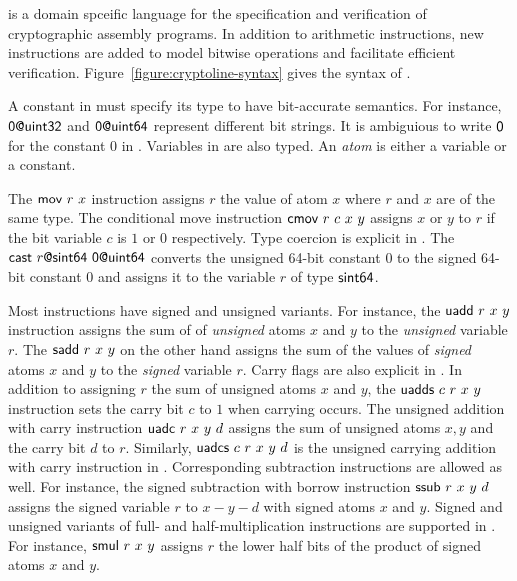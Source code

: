 \cryptoline is a domain spceific language for the specification and
verification of cryptographic assembly programs. In addition to
arithmetic instructions, new instructions are added to model bitwise
operations and facilitate efficient verification.
Figure~\ref{figure:cryptoline-syntax} gives the syntax of \cryptoline.

A constant in \cryptoline must specify its type to have bit-accurate
semantics. For instance, ${\textsf{{0@uint32}}}$ and ${\textsf{{0@uint64}}}$
represent different bit strings. It is ambiguious to write
${\textsf{{0}}}$ for the constant $0$ in \cryptoline. Variables in
\cryptoline are also typed. An \emph{atom} is either a variable or a
constant.

The ${\textsf{{mov}}}\ r\ x$ instruction assigns $r$ the value of atom $x$ where
$r$ and $x$ are of the same type. The conditional move instruction
${\textsf{{cmov}}}\ r\ c\ x\ y$ assigns $x$ or $y$ to $r$ if the bit variable
$c$ is $1$ or $0$ respectively. Type coercion is explicit in
\cryptoline. The $\clVPCast\ r\mytextsf{@sint64}\ \mytextsf{0@uint64}$
converts the unsigned 64-bit constant $0$ to the signed 64-bit
constant $0$ and assigns it to the variable $r$ of type ${\textsf{{sint64}}}$.

Most \cryptoline instructions have signed and unsigned variants. For
instance, the ${\textsf{{uadd}}}\ r\ x\ y$ instruction assigns the sum of
of \emph{unsigned} atoms $x$ and $y$ to the \emph{unsigned} variable
$r$. The ${\textsf{{sadd}}}\ r\ x\ y$ on the other hand assigns the sum of the
values of \emph{signed} atoms $x$ and $y$ to the \emph{signed}
variable $r$. Carry flags are also explicit in \cryptoline. In
addition to assigning $r$ the sum of unsigned atoms $x$ and $y$, the
${\textsf{{uadds}}}\ c\ r\ x\ y$ instruction sets the carry bit $c$ to $1$ when
carrying occurs. The unsigned addition with carry instruction
${\textsf{{uadc}}}\ r\ x\ y\ d$ assigns the sum of unsigned atoms $x, y$ and the
carry bit $d$ to $r$. Similarly, ${\textsf{{uadcs}}}\ c\ r\ x\ y\ d$ is the
unsigned carrying addition with carry instruction in \cryptoline.
Corresponding subtraction instructions are allowed as well. For
instance, the signed subtraction with borrow instruction $\clSSub\ r\
x\ y\ d$ assigns the signed variable $r$ to $x - y - d$ with signed
atoms $x$ and $y$. Signed and unsigned variants of full- and
half-multiplication instructions are supported in \cryptoline. For
instance, ${\textsf{{smul}}}\ r\ x\ y$ assigns $r$ the lower half bits of the
product of signed atoms $x$ and $y$.

